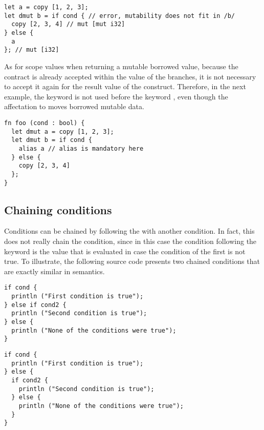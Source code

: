 \begin{lstlisting}[style=coloredverbatim]
let a = copy [1, 2, 3];
let dmut b = if cond { // error, mutability does not fit in /b/
  copy [2, 3, 4] // mut [mut i32]
} else {
  a
}; // mut [i32]
\end{lstlisting}

As for scope values when returning a mutable borrowed value, because
the  contract is already accepted within the value of the
branches, it is not necessary to accept it again for the result value of the
 construct. Therefore, in the next example, the keyword
 is not used before the keyword , even though the
affectation to  moves borrowed mutable data.

\begin{lstlisting}[style=coloredverbatim]
fn foo (cond : bool) {
  let dmut a = copy [1, 2, 3];
  let dmut b = if cond {
    alias a // alias is mandatory here
  } else {
    copy [2, 3, 4]
  };
}
\end{lstlisting}


\subsection{Chaining conditions}

Conditions can be chained by following the  with another
 condition. In fact, this does not really chain the condition, since
in this case the  condition following the  keyword is
the value that is evaluated in case the condition of the first  is
not true. To illustrate, the following source code presents two chained
 conditions that are exactly similar in semantics.


\begin{minipage}[t][][t]{0.47\linewidth}
\begin{lstlisting}[style=coloredverbatim, caption=Using a \token{if} as the value of the \token{else} branch]
if cond {
  println ("First condition is true");
} else if cond2 {
  println ("Second condition is true");
} else {
  println ("None of the conditions were true");
}
\end{lstlisting}
\end{minipage}\hspace{10pt}%
\begin{minipage}[t][][t]{0.47\linewidth}
  \begin{lstlisting}[style=coloredverbatim, caption=Using a block as the value of the \token{else} branch]
if cond {
  println ("First condition is true");
} else {
  if cond2 {
    println ("Second condition is true");
  } else {
    println ("None of the conditions were true");
  }
}
  \end{lstlisting}
\end{minipage}
\vspace{-10pt}%

